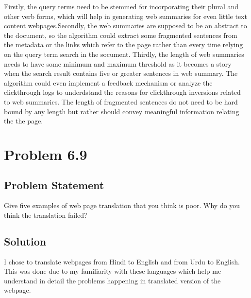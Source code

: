 \documentclass[12pt]{report}
\begin{document}
Firstly, the query terms need to be stemmed for incorporating their plural and other verb forms, which will help in generating web summaries for even little text content webpages.Secondly, the web summaries are supposed to be an abstract to the document, so the algorithm could extract some fragmented sentences from the metadata or the links which refer to the page rather than every time relying on the query term search in the socument. Thirdly, the length of web summaries needs to have some minimum and maximum threshold as it becomes a story when the search result contains five or greater sentences in web summary. The algorithm could even implement a feedback mechanism or analyze the clickthrough logs to underdstand the reasons for clickthrough inversions related to web summaries. The length of fragmented sentences do not need to be hard bound by any length but rather should convey meaningful information relating the the page.  
 
\chapter{Problem 6.9}
\section{Problem Statement}
Give five examples of web page translation that you think is poor. Why do you think the translation failed?
\section{Solution}
I chose to translate webpages from Hindi to English and from Urdu to English. This was done due to my familiarity with these languages which help me understand in detail the problems happening in translated version of the webpage.
\end{document}
